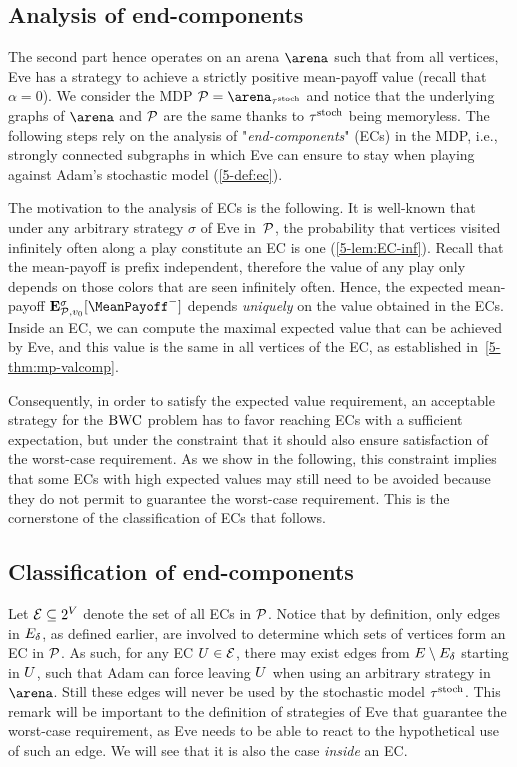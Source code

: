 \subsection*{Analysis of end-components} The second part hence operates on an arena $\arena$ such that from all vertices, Eve has a strategy to achieve a strictly positive mean-payoff value (recall that $\alpha = 0$). We consider the MDP $\markovProcess = \arena_{\stratStoch}$ and notice that the underlying graphs of $\arena$ and ${\mathcal{P}}$ are the same thanks to $\tau^{\text{stoch}}$ being memoryless. The following steps rely on the analysis of "\textit{end-components}" (ECs) in the MDP, i.e., strongly connected subgraphs in which Eve can ensure to stay when playing against Adam's stochastic model (\cref{5-def:ec}).

The motivation to the analysis of ECs is the following. It is well-known that under any arbitrary strategy $\sigma$ of Eve in~${\mathcal{P}}$, the probability that vertices visited infinitely often along a play constitute an EC is one (\cref{5-lem:EC-inf}). Recall that the mean-payoff is prefix independent, therefore the value of any play only depends on those colors that are seen infinitely often. Hence, the expected mean-payoff $\expv^{\sigma}_{\markovProcess,v_0}[\MeanPayoff^{-}]$ depends \textit{uniquely} on the value obtained in the ECs. Inside an EC, we can compute the maximal expected value that can be achieved by Eve, and this value is the same in all vertices of the EC, as established in~\cref{5-thm:mp-valcomp}.

Consequently, in order to satisfy the expected value requirement, an acceptable strategy for the $\text{BWC}$ problem has to favor reaching ECs with a sufficient expectation, but under the constraint that it should also ensure satisfaction of the worst-case requirement. As we show in the following, this constraint implies that some ECs with high expected values may still need to be avoided because they do not permit to guarantee the worst-case requirement. This is the cornerstone of the classification of ECs that follows.

\subsection*{Classification of end-components} Let $\mathcal{E} \subseteq 2^{V}$ denote the set of all ECs in ${\mathcal{P}}$. Notice that by definition, only edges in $E_{\delta}$, as defined earlier, are involved to determine which sets of vertices form an EC in ${\mathcal{P}}$. As such, for any EC $U \in \mathcal{E}$, there may exist edges from $E \setminus E_{\delta}$ starting in $U$, such that Adam can force leaving $U$ when using an arbitrary strategy in $\arena$. Still these edges will never be used by the stochastic model $\tau^{\text{stoch}}$. This remark will be important to the definition of strategies of Eve that guarantee the worst-case requirement, as Eve needs to be able to react to the hypothetical use of such an edge. We will see that it is also the case \textit{inside} an EC.

